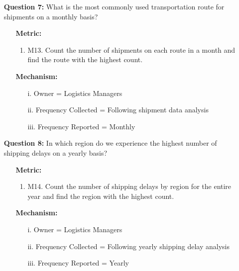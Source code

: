 \documentclass[english,12pt,a4paper]{report}
\begin{document}
\begin{itemize}
		\item[\textbullet] \textbf{Question 7:} What is the most commonly used transportation route for shipments on a monthly basis? 
		\begin{itemize}
			\item[] \textbf{Metric:}
			\begin{enumerate}[label={}, left=0em]
				\item M13. Count the number of shipments on each route in a month and find the route with the highest count.
			\end{enumerate}
			\item[] \textbf{Mechanism:}
			\begin{enumerate}[label={}, left=0em]
				\item[i.] Owner = Logistics Managers
				\item[ii.] Frequency Collected = Following shipment data analysis
				\item[iii.] Frequency Reported = Monthly
			\end{enumerate}
		\end{itemize}
		
		\item[\textbullet] \textbf{Question 8:} In which region do we experience the highest number of shipping delays on a yearly basis? 
		\begin{itemize}
			\item[] \textbf{Metric:}
			\begin{enumerate}[label={}, left=0em]
				\item M14. Count the number of shipping delays by region for the entire year and find the region with the highest count.
			\end{enumerate}
			\item[] \textbf{Mechanism:}
			\begin{enumerate}[label={}, left=0em]
				\item[i.] Owner = Logistics Managers
				\item[ii.] Frequency Collected = Following yearly shipping delay analysis
				\item[iii.] Frequency Reported = Yearly
			\end{enumerate}
		\end{itemize}
		

\end{itemize}
\end{document}
